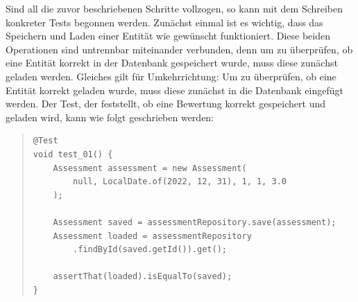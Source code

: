 Sind all die zuvor beschriebenen Schritte vollzogen, so kann mit dem Schreiben 
konkreter Tests begonnen werden. Zunächst einmal ist es wichtig, dass das Speichern 
und Laden einer Entität wie gewünscht funktioniert. Diese beiden Operationen sind 
untrennbar miteinander verbunden, denn um zu überprüfen, ob eine Entität korrekt in 
der Datenbank gespeichert wurde, muss diese zunächst geladen werden. Gleiches gilt für 
Umkehrrichtung: Um zu überprüfen, ob eine Entität korrekt geladen wurde, muss diese 
zunächst in die Datenbank eingefügt werden. Der Test, der feststellt, ob eine 
Bewertung korrekt gespeichert und geladen wird, kann wie folgt geschrieben werden: 

\pagebreak

\begin{quote}
\begin{verbatim}
@Test
void test_01() {
    Assessment assessment = new Assessment(
        null, LocalDate.of(2022, 12, 31), 1, 1, 3.0
    );

    Assessment saved = assessmentRepository.save(assessment);
    Assessment loaded = assessmentRepository
        .findById(saved.getId()).get();

    assertThat(loaded).isEqualTo(saved);
}
\end{verbatim}
\end{quote}

